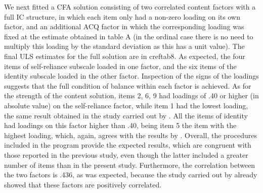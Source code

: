We next fitted a CFA solution consisting of two correlated content factors with a full IC structure, in which each item only had a non-zero loading on its own factor, and an additional ACQ factor in which the corresponding loading was fixed at the estimate obtained in table A (in the ordinal case there is no need to multiply this loading by the standard deviation as this has a unit value). The final ULS estimates for the full solution are in cref{tab8}. As expected, the four items of self-reliance subscale loaded in one factor, and the six items of the identity subscale loaded in the other factor. Inspection of the signs of the loadings suggests that the full condition of balance within each factor is achieved. As for the strength of the content solution, items 2, 6, 9 had loadings of .40 or higher (in absolute value) on the self-reliance factor, while item 1 had the lowest loading, the same result obtained in the study carried out by \citet{Morales-Vives:2013}. All the items of identity had loadings on this factor higher than .40, being item 5 the item with the highest loading, which, again, agrees with the results by \citet{Morales-Vives:2013}. Overall, the procedures included in the  program provide the expected results, which are congruent with those reported in the previous study, even though the latter included a greater number of items than in the present study. Furthermore, the correlation between the two factors is .436, as was expected, because the study carried out by \citet{Morales-Vives:2013} already showed that these factors are positively correlated.

